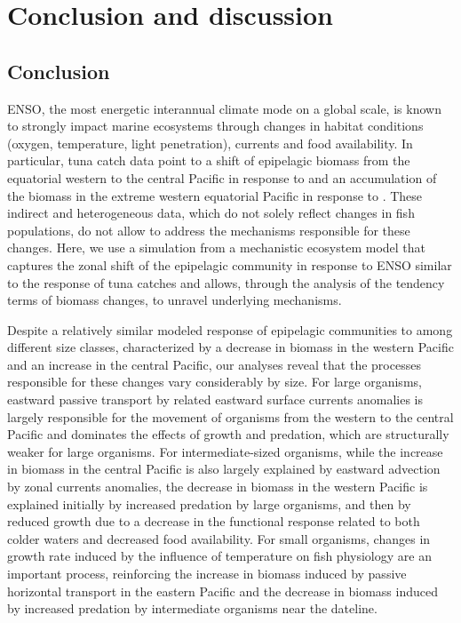 
\section{Conclusion and discussion}
\label{sec:conclusion}


\subsection{Conclusion}

ENSO, the most energetic interannual climate mode on a  global scale, is known to strongly impact marine ecosystems through changes in habitat conditions (oxygen, temperature, light penetration), currents and food availability. In particular, tuna catch data point to a shift of epipelagic biomass from the equatorial western to the central Pacific in response to \nino{} and an accumulation of the biomass in the extreme western equatorial Pacific in response to \nina{}. These indirect and heterogeneous data, which do not solely reflect changes in fish populations, do not allow to address the mechanisms responsible for these changes. Here, we use a simulation from a mechanistic ecosystem model that captures the zonal shift of the epipelagic community in response to ENSO similar to the response of tuna catches and allows, through the analysis of the tendency terms of biomass changes, to unravel underlying mechanisms.

Despite a relatively similar modeled response of epipelagic communities to \nino{} among different size classes, characterized by a decrease in biomass in the western Pacific and an increase in the central Pacific, our analyses reveal that the processes responsible for these changes vary considerably by size. For large organisms,  eastward passive transport by \nino{} related eastward surface currents anomalies is largely responsible for the movement of organisms from the western to the central Pacific and dominates the effects of growth and predation, which are structurally weaker for large organisms. For intermediate-sized organisms, while the increase in biomass in the central Pacific is also largely explained by eastward advection by zonal currents anomalies, the decrease in biomass in the western Pacific is explained initially by increased predation by large organisms, and then by reduced growth due to a decrease in the functional response related to both colder waters and decreased food availability. For small organisms, changes in growth rate  induced by the influence of temperature on fish physiology are an important process, reinforcing the increase in biomass induced by passive horizontal transport in the eastern Pacific and the decrease in biomass induced by increased predation by intermediate organisms near the dateline.

